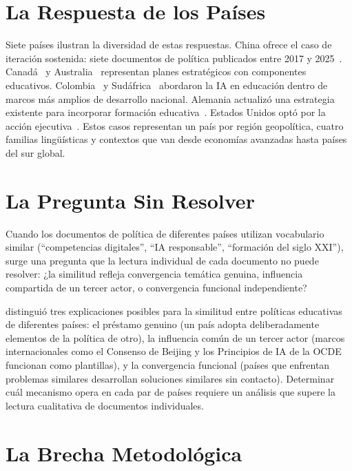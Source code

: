 \section{La Respuesta de los Países}
\label{sec:respuesta-paises}

Siete países ilustran la diversidad de estas respuestas. China ofrece el caso de iteración sostenida: siete documentos de política publicados entre 2017 y 2025~\citep{china2017ai}. Canadá~\citep{canada2017ai} y Australia~\citep{australia2021aiaction} representan planes estratégicos con componentes educativos. Colombia~\citep{colombia2019conpes} y Sudáfrica~\citep{southafrica2020pc4ir} abordaron la IA en educación dentro de marcos más amplios de desarrollo nacional. Alemania actualizó una estrategia existente para incorporar formación educativa~\citep{germany2020aiupdate}. Estados Unidos optó por la acción ejecutiva~\citep{whitehouse2023aeo}. Estos casos representan un país por región geopolítica, cuatro familias lingüísticas y contextos que van desde economías avanzadas hasta países del sur global.


\section{La Pregunta Sin Resolver}
\label{sec:pregunta}

Cuando los documentos de política de diferentes países utilizan vocabulario similar (``competencias digitales'', ``IA responsable'', ``formación del siglo XXI''), surge una pregunta que la lectura individual de cada documento no puede resolver: ¿la similitud refleja convergencia temática genuina, influencia compartida de un tercer actor, o convergencia funcional independiente?

\citet{steinerkhamsi2014cross} distinguió tres explicaciones posibles para la similitud entre políticas educativas de diferentes países: el préstamo genuino (un país adopta deliberadamente elementos de la política de otro), la influencia común de un tercer actor (marcos internacionales como el Consenso de Beijing y los Principios de IA de la OCDE funcionan como plantillas), y la convergencia funcional (países que enfrentan problemas similares desarrollan soluciones similares sin contacto). Determinar cuál mecanismo opera en cada par de países requiere un análisis que supere la lectura cualitativa de documentos individuales.


\section{La Brecha Metodológica}
\label{sec:brecha}

